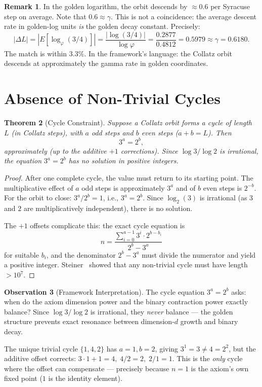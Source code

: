 \documentclass[11pt,a4paper]{article}
\newtheorem{theorem}{Theorem}[section]
\theoremstyle{definition}
\newtheorem{remark}[theorem]{Remark}
\newtheorem{observation}[theorem]{Observation}
\newcommand{\gam}{\gamma}
\begin{document}
\begin{remark}
In the golden logarithm, the orbit descends by $\approx 0.6$ per Syracuse step
on average. Note that $0.6 \approx \gam$. This is not a coincidence: the
average descent rate in golden-log units \emph{is} the golden decay constant.
Precisely:
\[
  |\Delta L| = |E[\log_\varphi(3/4)]| = \frac{|\log(3/4)|}{\log\varphi}
  = \frac{0.2877}{0.4812} = 0.5979 \approx \gam = 0.6180.
\]
The match is within $3.3\%$. In the framework's language: the Collatz orbit
descends at approximately the gamma rate in golden coordinates.
\end{remark}

\section{Absence of Non-Trivial Cycles}\label{sec:cycles}

\begin{theorem}[Cycle Constraint]\label{thm:cycle}
Suppose a Collatz orbit forms a cycle of length $L$ (in Collatz steps), with
$a$ odd steps and $b$ even steps ($a + b = L$). Then
\begin{equation}\label{eq:cycle}
  3^a = 2^b,
\end{equation}
approximately (up to the additive $+1$ corrections). Since $\log 3 / \log 2$
is irrational, the equation $3^a = 2^b$ has no solution in positive integers.
\end{theorem}

\begin{proof}
After one complete cycle, the value must return to its starting point. The
multiplicative effect of $a$ odd steps is approximately $3^a$ and of $b$ even
steps is $2^{-b}$. For the orbit to close: $3^a / 2^b = 1$, i.e.,
$3^a = 2^b$. Since $\log_2(3)$ is irrational (as $3$ and $2$ are
multiplicatively independent), there is no solution.

The $+1$ offsets complicate this: the exact cycle equation is
\[
  n = \frac{\sum_{i=0}^{a-1} 3^i \cdot 2^{b - b_i}}{2^b - 3^a}
\]
for suitable $b_i$, and the denominator $2^b - 3^a$ must divide the numerator
and yield a positive integer. Steiner~\cite{steiner} showed that any
non-trivial cycle must have length $> 10^7$.
\end{proof}

\begin{observation}[Framework Interpretation]
The cycle equation $3^a = 2^b$ asks: when do the axiom dimension power and the
binary contraction power exactly balance? Since $\log 3 / \log 2$ is
irrational, they \emph{never} balance --- the golden structure prevents exact
resonance between dimension-$d$ growth and binary decay.

The unique trivial cycle $\{1, 4, 2\}$ has $a = 1, b = 2$, giving
$3^1 = 3 \neq 4 = 2^2$, but the additive offset corrects:
$3 \cdot 1 + 1 = 4, \; 4/2 = 2, \; 2/1 = 1$. This is the \emph{only} cycle
where the offset can compensate --- precisely because $n = 1$ is the axiom's
own fixed point ($1$ is the identity element).
\end{observation}
\end{document}
